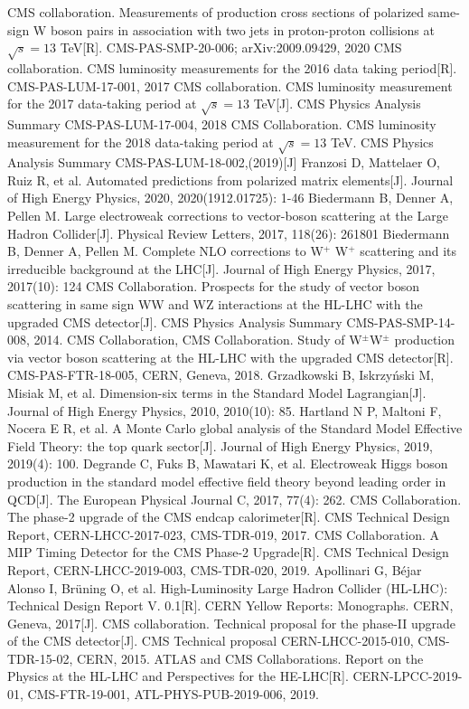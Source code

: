 \documentclass{SCIS2020cn}
\begin{document}
\begin{thebibliography}{99}
 CMS collaboration. Measurements of production cross sections of polarized same-sign W boson pairs in association with two jets in proton-proton collisions at $\sqrt{s} = 13$ TeV[R]. CMS-PAS-SMP-20-006; arXiv:2009.09429, 2020
 CMS collaboration. CMS luminosity measurements for the 2016 data taking period[R]. CMS-PAS-LUM-17-001, 2017
 CMS collaboration. CMS luminosity measurement for the 2017 data-taking period at $\sqrt{s} = 13$ TeV[J]. CMS Physics Analysis Summary CMS-PAS-LUM-17-004, 2018
 CMS Collaboration. CMS luminosity measurement for the 2018 data-taking period at $\sqrt{s} = 13$ TeV. CMS Physics Analysis Summary CMS-PAS-LUM-18-002,(2019)[J]
 Franzosi D, Mattelaer O, Ruiz R, et al. Automated predictions from polarized matrix elements[J]. Journal of High Energy Physics, 2020, 2020(1912.01725): 1-46
 Biedermann B, Denner A, Pellen M. Large electroweak corrections to vector-boson scattering at the Large Hadron Collider[J]. Physical Review Letters, 2017, 118(26): 261801
 Biedermann B, Denner A, Pellen M. Complete NLO corrections to W$^+$ W$^+$ scattering and its irreducible background at the LHC[J]. Journal of High Energy Physics, 2017, 2017(10): 124
 CMS Collaboration. Prospects for the study of vector boson scattering in same sign WW and WZ interactions at the HL-LHC with the upgraded CMS detector[J]. CMS Physics Analysis Summary CMS-PAS-SMP-14-008, 2014.
 CMS Collaboration, CMS Collaboration. Study of W$^{\pm}$W$^{\pm}$ production via vector boson scattering at the HL-LHC with the upgraded CMS detector[R]. CMS-PAS-FTR-18-005, CERN, Geneva, 2018.
 Grzadkowski B, Iskrzyński M, Misiak M, et al. Dimension-six terms in the Standard Model Lagrangian[J]. Journal of High Energy Physics, 2010, 2010(10): 85.
 Hartland N P, Maltoni F, Nocera E R, et al. A Monte Carlo global analysis of the Standard Model Effective Field Theory: the top quark sector[J]. Journal of High Energy Physics, 2019, 2019(4): 100.
 Degrande C, Fuks B, Mawatari K, et al. Electroweak Higgs boson production in the standard model effective field theory beyond leading order in QCD[J]. The European Physical Journal C, 2017, 77(4): 262.
 CMS Collaboration. The phase-2 upgrade of the CMS endcap calorimeter[R]. CMS Technical Design Report, CERN-LHCC-2017-023, CMS-TDR-019, 2017.
 CMS Collaboration. A MIP Timing Detector for the CMS Phase-2 Upgrade[R]. CMS Technical Design Report, CERN-LHCC-2019-003, CMS-TDR-020, 2019.
 Apollinari G, Béjar Alonso I, Brüning O, et al. High-Luminosity Large Hadron Collider (HL-LHC): Technical Design Report V. 0.1[R]. CERN Yellow Reports: Monographs. CERN, Geneva, 2017[J].
 CMS collaboration. Technical proposal for the phase-II upgrade of the CMS detector[J]. CMS Technical proposal CERN-LHCC-2015-010, CMS-TDR-15-02, CERN, 2015.
 ATLAS and CMS Collaborations. Report on the Physics at the HL-LHC and Perspectives for the HE-LHC[R]. CERN-LPCC-2019-01, CMS-FTR-19-001, ATL-PHYS-PUB-2019-006, 2019.

\end{thebibliography}
\end{document}
